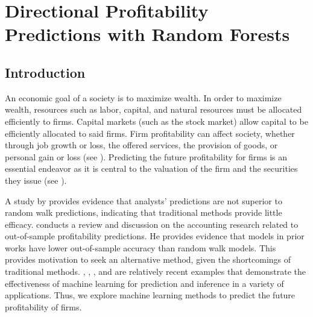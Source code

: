 \chapter{Directional Profitability Predictions with Random Forests} \label{Chapter:ABIS}

\section{Introduction}



An economic goal of a society is to maximize wealth.  In order to maximize wealth, resources such as labor, capital, and natural resources must be allocated efficiently to firms. Capital markets (such as the stock market) allow capital to be efficiently allocated to said firms. Firm profitability can affect society, whether through job growth or loss, the offered services, the provision of goods, or personal gain or loss (see \cite{IntAccBook}).  Predicting the future profitability for firms is an essential endeavor as it is central to the valuation of the firm and the securities they issue (see \cite{Monahan}). 

A study by \cite{Bradshaw} provides evidence that analysts' predictions are not superior to random walk predictions, indicating that traditional methods provide little efficacy. \cite{Monahan} conducts a review and discussion on the accounting research related to out-of-sample profitability predictions.  He provides evidence that models in prior works have lower out-of-sample accuracy than random walk models. This provides motivation to seek an alternative method, given the shortcomings of traditional methods.   \cite{ABIS:ML:EX1},  \cite{ABIS:ML:EX2},  \cite{ABIS:ML:EX3},  and \cite{ABIS:ML:EX4} are relatively recent examples that demonstrate the effectiveness of machine learning for prediction and inference in a variety of applications.  Thus, we explore machine learning methods to predict the future profitability of firms.
 
